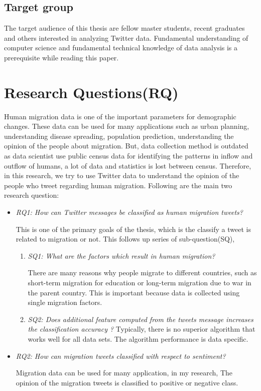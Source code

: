\subsection{Target group}
The target audience of this thesis are fellow master students, recent graduates and others interested in analyzing Twitter data. Fundamental understanding of computer science and fundamental technical knowledge of data analysis is a prerequisite while reading this paper.

\section{Research Questions(RQ)}
Human migration data is one of the important parameters for demographic changes. These data can be used for many applications such as urban planning, understanding disease spreading,  population prediction, understanding the opinion of the people about migration. But, data collection method
is outdated as data scientist use public census data for identifying the patterns in inflow and outflow of humans, a lot of data and statistics is lost between census. Therefore, in this research, we try to use Twitter data to understand the opinion of the people who tweet regarding human migration. Following are the main two research question:

\begin{itemize}

    \item  \textit{RQ1: How can Twitter messages be classified as human migration tweets?}
    
    This is one of the primary goals of the thesis, which is the classify a tweet is related to migration or not. This follows up series of sub-question(SQ),
    
    \begin{enumerate}
        \item \textit{SQ1: What are the factors which result in human migration?}
        
        There are many reasons why people migrate to different countries, such as short-term migration for education or long-term migration due to war in the parent country. This is important because data is collected using single migration factors. 
        \item \textit{SQ2: Does additional feature computed from the tweets message increases the classification accuracy ?}
        Typically, there is no superior algorithm that works well for all data sets. The algorithm performance is data specific. 
        
    \end{enumerate}
    
    
  
    
    \item \textit{RQ2: How can migration tweets classified with respect to sentiment?}
    
    Migration data can be used for many application, in my research, The opinion of the migration tweets is classified to positive or negative class.
\end{itemize}




